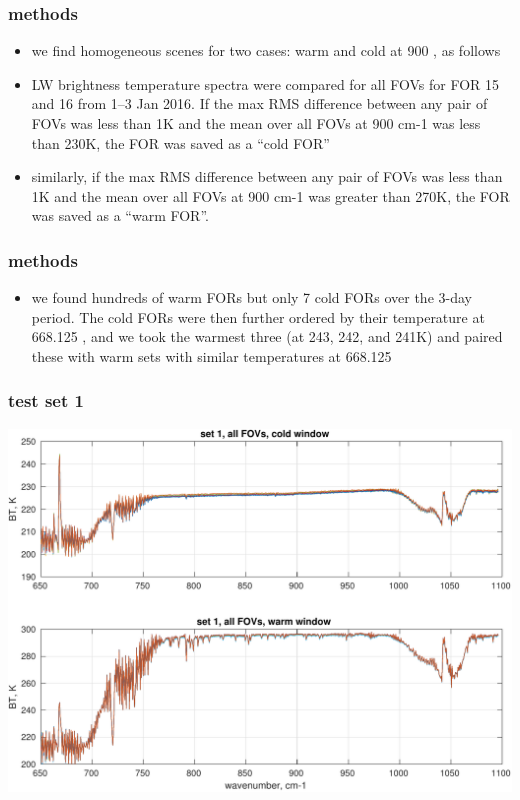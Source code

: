 \documentclass[11pt]{beamer}
\begin{document}
\begin{frame}
\frametitle{methods}

\begin{itemize}

  \item we find homogeneous scenes for two cases: warm and cold at
    900 \wn, as follows

  \item LW brightness temperature spectra were compared for all FOVs
    for FOR 15 and 16 from 1--3 Jan 2016.  If the max RMS difference
    between any pair of FOVs was less than 1K and the mean over all
    FOVs at 900 cm-1 was less than 230K, the FOR was saved as a
    ``cold FOR''

  \item similarly, if the max RMS difference between any pair of
    FOVs was less than 1K and the mean over all FOVs at 900 cm-1 was
    greater than 270K, the FOR was saved as a ``warm FOR''.

\end{itemize}

\end{frame}
\begin{frame}
\frametitle{methods}

\begin{itemize}

  \item we found hundreds of warm FORs but only 7 cold FORs over the
    3-day period.  The cold FORs were then further ordered by their
    temperature at 668.125 \wn, and we took the warmest three (at
    243, 242, and 241K) and paired these with warm sets with similar
    temperatures at 668.125 \wn

\end{itemize}

\end{frame}
\begin{frame}
\frametitle{test set 1}
\begin{center}
  \includegraphics[scale=0.5]{figures/set1_all.pdf}
\end{center}
\end{frame}
\end{document}
